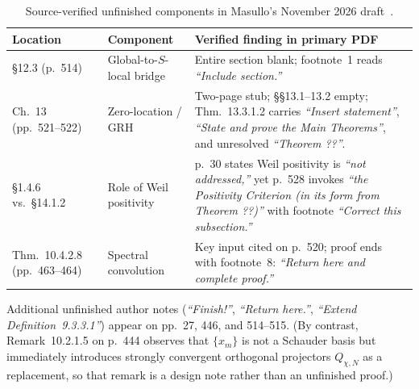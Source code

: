 \documentclass[11pt]{amsart}
\theoremstyle{definition}
\theoremstyle{remark}
\begin{document}
\begin{table}[!htbp]
\centering\footnotesize\renewcommand{\arraystretch}{0.90}
\caption{Source-verified unfinished components in Masullo's November 2026 draft~\cite{Masullo}.}\label{tab:masullo}
\begin{tabular}{@{}>{\raggedright\arraybackslash}p{}>{\raggedright\arraybackslash}p{}>{\raggedright\arraybackslash}p{}@{}}
\toprule
Location & Component & Verified finding in primary PDF\\
\midrule
\S 12.3 (p.~514) & Global-to-$S$-local bridge & Entire section blank; footnote~1 reads \emph{``Include section.''}\\
\addlinespace[2pt]
Ch.~13 (pp.~521--522) & Zero-location / GRH & Two-page stub; \S\S 13.1--13.2 empty; Thm.~13.3.1.2 carries \emph{``Insert statement''}, \emph{``State and prove the Main Theorems''}, and unresolved \emph{``Theorem ??''}.\\
\addlinespace[2pt]
\S 1.4.6 vs.\ \S 14.1.2 & Role of Weil positivity & p.~30 states Weil positivity is \emph{``not addressed,''} yet p.~528 invokes \emph{``the Positivity Criterion (in its form from Theorem ??)''} with footnote \emph{``Correct this subsection.''}\\
\addlinespace[2pt]
Thm.~10.4.2.8 (pp.~463--464) & Spectral convolution & Key input cited on p.~520; proof ends with footnote~8: \emph{``Return here and complete proof.''}\\
\bottomrule
\end{tabular}
\end{table}

Additional unfinished author notes (\emph{``Finish!''}, \emph{``Return here.''}, \emph{``Extend Definition~9.3.3.1''}) appear on pp.~27, 446, and 514--515. (By contrast, Remark~10.2.1.5 on p.~444 observes that $\{x_m\}$ is not a Schauder basis but immediately introduces strongly convergent orthogonal projectors $Q_{\chi,N}$ as a replacement, so that remark is a design note rather than an unfinished proof.)
\end{document}
